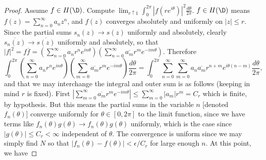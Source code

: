 \documentclass[11pt]{book}
\theoremstyle{definition}
\begin{document}
\begin{proof}
Assume $f\in H(\D)$. Compute $\lim_{r\uparrow 1} \int_0^{2\pi} |f(re^{i\theta})|^2\frac{d\theta}{2\pi}$. %
$f\in H(\D)$ means $f(z)=\sum_{n=0}^\infty a_nz^n$, and $f(z)$ converges absolutely and uniformly on $|z|\leq r$. Since the partial sums $s_n(z)\to s(z)$ uniformly and absolutely, clearly $\overline{s_n(z)}\to \overline{s(z)}$ uniformly and absolutely, so that $|f|^2=f\overline{f}=\left(\sum_{n=0}^\infty a_nr^ne^{in\theta}\right)\left(\sum_{n=0}^\infty \overline{a_m}r^me^{-im\theta}\right)$. Therefore 
\[
\int_0^{2\pi}\left(\sum_{n=0}^\infty a_nr^ne^{in\theta}\right)\left(\sum_{m=0}^\infty \overline{a_m}r^me^{-im\theta}\right)\frac{d\theta}{2\pi}=\int_0^{2\pi}\sum_{n=0}^{\infty}\sum_{m=0}^\infty a_n\overline{a_m}r^{n+m}e^{i\theta(n-m)}\frac{d\theta}{2\pi},
\]
and that we may interchange the integral and outer sum is as follows (keeping in mind $r$ is fixed). First $\left|\sum_{m=0}^\infty \overline{a_m}r^me^{-im\theta}\right|\leq \sum_{m=0}^\infty |a_m|r^m=C_r$ which is finite, by hypothesis. But this means the partial sums in the variable $n$ [denoted $f_n(\theta)]$ converge uniformly for $\theta\in [0,2\pi]$ to the limit function, since we have terms like $f_n(\theta)g(\theta)\to f_n(\theta)g(\theta)$ uniformly, which is the case since $|g(\theta)|\leq C_r<\infty$ independent of $\theta$. The convergence is uniform since we may simply find $N$ so that $|f_n(\theta)-f(\theta)|<\epsilon/C_r$ for large enough $n$. At this point, we have

\end{proof}
\end{document}
